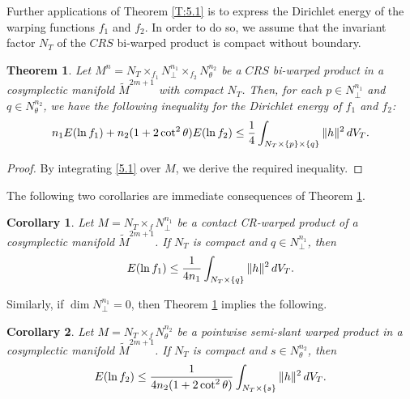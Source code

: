 \documentclass[reqno]{amsart}
\theoremstyle{plain}
\newtheorem{theorem}{Theorem}[section]
\newtheorem{corollary}{Corollary}[section]
\theoremstyle{remark}
\numberwithin{equation}{section}
\begin{document}
Further applications of Theorem \ref{T:5.1} is to express the Dirichlet energy of the warping functions $f_1$ and $f_2$. In order to do so, we assume that the invariant factor $N_{T}$ of the $CRS$ bi-warped product is compact without boundary.

\begin{theorem}\label{T:6.1} Let $M^n=N_T\times_{f_1}N^{n_1}_\perp\times_{f_2}N^{n_2}_\theta$ be a $CRS$ bi-warped product in a cosymplectic manifold $\widetilde M^{2m+1}$ with compact $N_T$.  Then,  for each $p\in N^{n_{1}}_\perp$ and $q\in N^{n_{2}}_\theta$, we have the following inequality for the Dirichlet energy of $f_1$ and $f_2$:
\begin{equation}\begin{aligned}\notag 
n_1E(\ln f_1)+n_2(1+2\cot^{2}\theta)E(\ln f_2) \leq\frac{1}{4}\int_{N_T\times\{p\}\times\{q\}}\|h\|^2\,dV_T.
\end{aligned}\end{equation}
 \end{theorem}
\begin{proof} By integrating \eqref{5.1} over $M$, we derive the required inequality. 
\end{proof}

The following two corollaries are immediate consequences of Theorem \ref{T:6.1}. 

\begin{corollary}\label{C:6.1} Let $M=N_T\times_fN^{n_{1}}_\perp$ be a contact CR-warped product of a cosymplectic manifold $\widetilde M^{2m+1}$. If $N_T$ is compact and  $q\in N^{n_{1}}_\perp$, then
\begin{align}\notag
E(\ln f_1)\le\frac{1}{4n_1}\int_{N_T\times\{q\}}\|h\|^2\,dV_T.
\end{align}
\end{corollary}

Similarly, if $\dim N^{n_{1}}_\perp=0$, then Theorem \ref{T:6.1} implies the following.

\begin{corollary}\label{C:6.2} Let $M=N_T\times_fN^{n_{2}}_\theta$ be a  pointwise semi-slant warped product in a cosymplectic manifold $\widetilde M^{2m+1}$. If $N_T$ is compact and $s\in N^{n_{2}}_\theta$, then
\begin{align}\notag
E(\ln f_2)\le\frac{1}{4n_2(1+2\cot^2\theta)}\int_{N_T\times\{s\}}\|h\|^2\,dV_T.
\end{align}
\end{corollary}
\end{document}
